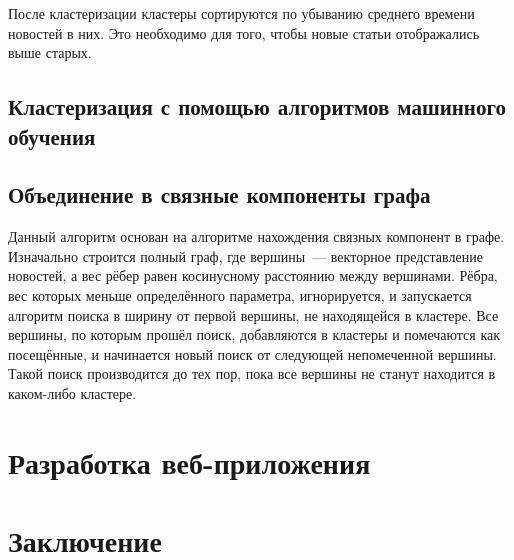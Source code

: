 \documentclass[a4paper, 14pt]{extarticle}
\begin{document}
После кластеризации кластеры сортируются по убыванию среднего времени новостей в них. Это необходимо для того, чтобы новые
статьи отображались выше старых.

\subsection{Кластеризация с помощью алгоритмов машинного обучения}

\subsection{Объединение в связные компоненты графа}
Данный алгоритм основан на алгоритме нахождения связных компонент в графе. Изначально строится полный граф,
где вершины~--- векторное представление новостей, а вес рёбер равен косинусному расстоянию между вершинами.
Рёбра, вес которых меньше определённого параметра, игнорируется, и запускается алгоритм поиска в ширину
от первой вершины, не находящейся в кластере. Все вершины, по которым прошёл поиск, добавляются
в кластеры и помечаются как посещённые, и начинается новый поиск от следующей непомеченной вершины.
Такой поиск производится до тех пор, пока все вершины не станут находится в каком-либо кластере.

\section{Разработка веб-приложения}


\section{Заключение}


\setcounter{secnumdepth}{0}
\end{document}
